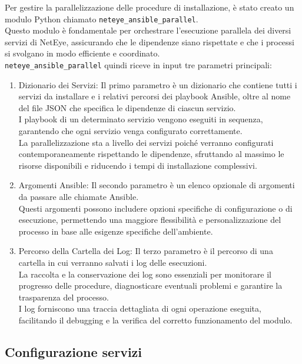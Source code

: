 Per gestire la parallelizzazione delle procedure di installazione, è stato
creato un modulo Python chiamato \texttt{neteye\_ansible\_parallel}.\\ Questo modulo
è fondamentale per orchestrare l'esecuzione parallela dei diversi servizi di NetEye,
assicurando che le dipendenze siano rispettate e che i processi si svolgano in
modo efficiente e coordinato.\\ \texttt{neteye\_ansible\_parallel} quindi riceve
in input tre parametri principali:
\begin{enumerate}
  \item Dizionario dei Servizi: Il primo parametro è un dizionario che contiene
    tutti i servizi da installare e i relativi percorsi dei playbook Ansible, oltre
    al nome del file JSON che specifica le dipendenze di ciascun servizio.\\ I playbook
    di un determinato servizio vengono eseguiti in sequenza, garantendo che ogni
    servizio venga configurato correttamente.\\ La parallelizzazione sta a
    livello dei servizi poiché verranno configurati contemporaneamente
    rispettando le dipendenze, sfruttando al massimo le risorse disponibili e riducendo
    i tempi di installazione complessivi.

  \item Argomenti Ansible: Il secondo parametro è un elenco opzionale di
    argomenti da passare alle chiamate Ansible.\\ Questi argomenti possono
    includere opzioni specifiche di configurazione o di esecuzione, permettendo una
    maggiore flessibilità e personalizzazione del processo in base alle esigenze
    specifiche dell'ambiente.

  \item Percorso della Cartella dei Log: Il terzo parametro è il percorso di una
    cartella in cui verranno salvati i log delle esecuzioni.\\ La raccolta e la
    conservazione dei log sono essenziali per monitorare il progresso delle
    procedure, diagnosticare eventuali problemi e garantire la trasparenza del processo.\\
    I log forniscono una traccia dettagliata di ogni operazione eseguita,
    facilitando il debugging e la verifica del corretto funzionamento del modulo.
\end{enumerate}

\subsection{Configurazione servizi}
\label{sub:configurazione_parallelizzazione}

